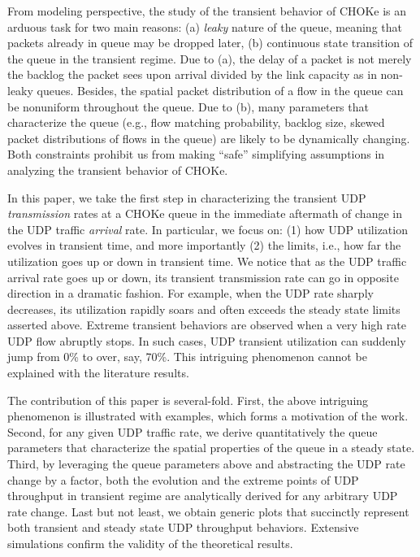 \documentclass{IEEEtran}
\begin{document}
    From modeling perspective, the study of the transient behavior of CHOKe is an arduous task for two main reasons: (a) {\em leaky} nature of the queue, meaning that packets already in queue may be dropped later, (b) continuous state transition of the queue in the transient regime. Due to (a), the delay of a packet is not merely the backlog the packet sees upon arrival divided by the link capacity as in non-leaky queues. Besides, the spatial packet distribution of a flow in the queue can be nonuniform throughout the queue. Due to (b), many parameters that characterize the queue (e.g., flow matching probability, backlog size, skewed packet distributions of flows in the queue) are likely to be dynamically changing. Both constraints prohibit us from making ``safe'' simplifying assumptions in analyzing the transient behavior of CHOKe. 


    In this paper, we take the first step in characterizing the transient UDP {\em transmission} rates at a CHOKe queue in the immediate aftermath of change in the UDP traffic {\em arrival} rate. In particular, we focus on: (1) how UDP utilization evolves in transient time, and more importantly (2) the limits, i.e., how far the utilization goes up or down in transient time. We notice that as the UDP traffic arrival rate goes up or down, its transient transmission rate can go in opposite direction in a dramatic fashion. For example, when the UDP rate sharply decreases, its utilization rapidly soars and often exceeds the steady state limits asserted above. Extreme transient behaviors are observed when a very high rate UDP flow abruptly stops. In such cases, UDP transient utilization can suddenly jump from 0\% to over, say, 70\%. This intriguing phenomenon cannot be explained with the literature results.

The contribution of this paper is several-fold. First, the above intriguing phenomenon is illustrated with examples, which forms a motivation of the work. Second, for any given UDP traffic rate, we  derive quantitatively the queue parameters that characterize the spatial properties of the queue in a steady state. Third, by leveraging the queue parameters above and abstracting the UDP rate change by a factor, both the evolution and the extreme points of UDP throughput in transient regime are analytically derived for any arbitrary UDP rate change. Last but not least, we obtain generic plots that succinctly represent both transient and steady state UDP throughput behaviors. Extensive simulations confirm the validity of the theoretical results. 
\end{document}

